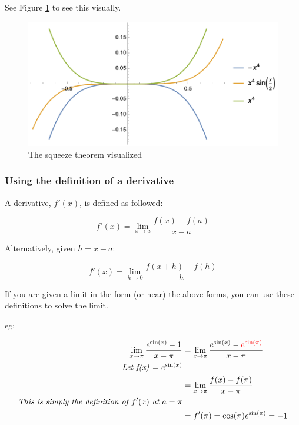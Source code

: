 \documentclass[12pt]{article}
\begin{document}
See Figure \ref{squeeze} to see this visually.

\begin{figure}[!ht]
    \centering
    \includegraphics[width=12.0cm]{misc/squeezetheorem.png}
    \caption{The squeeze theorem visualized}
    \label{squeeze}
\end{figure}

\subsubsection{Using the definition of a derivative}

A derivative, $f'(x)$, is defined as followed:

$$f'(x) = \lim_{x\to a}\frac{f(x)-f(a)}{x-a}$$

Alternatively, given $h = x-a$:

$$f'(x) = \lim_{h\to 0} \frac{f(x+h)-f(h)}{h}$$

If you are given a limit in the form (or near) the above forms, you can use these definitions to solve the limit. 

eg: 

\begin{equation}
    \begin{split}
    \lim_{x\to \pi}\frac{e^{\sin(x)} - 1}{x - \pi} &= \lim_{x\to \pi}\frac{e^{\sin(x)} - \textcolor{red}{e^{\sin(\pi)}}}{x - \pi}\\
    \textit{Let f(x) = $e^{\sin(x)}$}\\
    &=\lim_{x\to \pi}\frac{f(x)-f(\pi)}{x - \pi}\\
    \textit{This is simply the definition of $f'(x)$ at $a=\pi$}\\
    &=f'(\pi) = \cos(\pi)e^{\sin(\pi)} = -1
    \end{split}
\end{equation}
\end{document}
